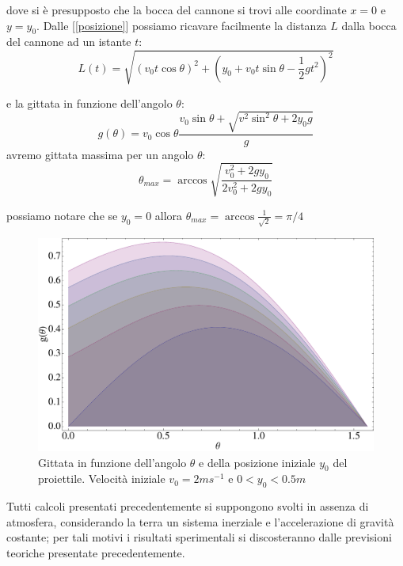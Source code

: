 \documentclass[a4paper,10pt,oneside]{article}
\begin{document}
dove si è presupposto che la bocca del cannone si trovi alle coordinate $x=0$ e $y=y_0$. Dalle [\ref{posizione}] possiamo ricavare facilmente la distanza $L$ dalla bocca del cannone ad un istante $t$:
\begin{equation}
 L(t)=\sqrt{(v_0 t\cos\theta )^2+(y_0+v_0t \sin \theta-\frac 1 2 g t^2)^2}
\end{equation}

e la gittata in  funzione dell'angolo $\theta$:
\begin{equation}
 g(\theta)=v_0\cos \theta\frac{v_0\sin\theta+\sqrt{v^2\sin^2\theta+2 y_0 g}}{g}
\end{equation}
avremo gittata massima per un angolo $\theta$:
\begin{equation}
 \theta_{max}=\arccos\sqrt{\frac{v_0^2+2gy_0}{2v_0^2+2gy_0}}
\end{equation}

possiamo notare che se $y_0=0$ allora $\theta_{max}=\arccos\frac{1}{\sqrt 2}=\pi/4$ 
\begin{figure}[H]
 \centering
 \includegraphics[width=\textwidth]{./Immagini/gittata1.pdf}
 \caption{Gittata in funzione dell'angolo $\theta$ e della posizione iniziale $y_0$ del proiettile. Velocità iniziale $v_0=2ms^{-1}$ e $0<y_0<0.5 m$}
 \label{fig:gittata_variazione}
\end{figure}

Tutti calcoli presentati precedentemente si suppongono svolti in assenza di atmosfera, considerando la terra un sistema inerziale e l'accelerazione di gravità costante; per tali motivi i risultati sperimentali si discosteranno dalle previsioni teoriche presentate precedentemente.
\end{document}
